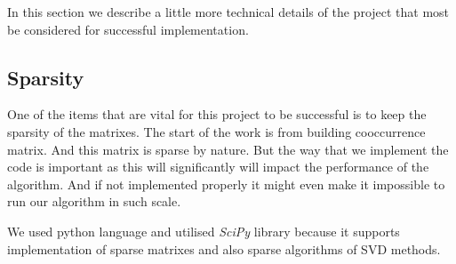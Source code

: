 In this section we describe a little more technical details of the project that most be considered for successful implementation. 
\subsection{Sparsity}
One of the items that are vital for this project to be successful is to keep the sparsity of the matrixes. The start of the work is from building cooccurrence matrix. And this matrix is sparse by nature. But the way that we implement the code is important as this will significantly will impact the performance of the algorithm. And if not implemented properly it might even make it impossible to run our algorithm in such scale. 

We used python language and utilised \textit{SciPy} library because it supports implementation of sparse matrixes and also sparse algorithms of SVD methods. 